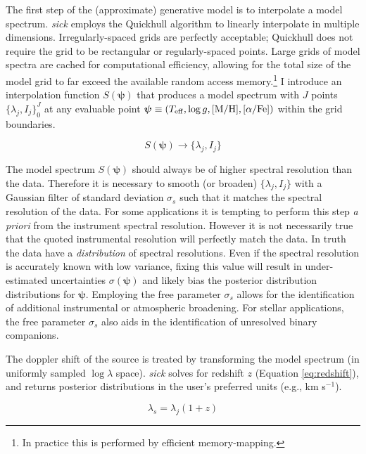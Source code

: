 \documentclass{aastex}
\newcommand{\sick}{\textit{sick}}
\begin{document}
The first step of the (approximate) generative model is to interpolate a model spectrum. \sick{} employs the Quickhull algorithm \citep{quickhull} to linearly interpolate in multiple dimensions. Irregularly-spaced grids are perfectly acceptable; Quickhull does not require the grid to be rectangular or regularly-spaced points. Large grids of model spectra are cached for computational efficiency, allowing for the total size of the model grid to far exceed the available random access memory.\footnote{In practice this is performed by efficient memory-mapping.} I introduce an interpolation function $S(\bm{\psi})$ that produces a model spectrum with $J$ points $\{\lambda_j,I_j\}_{0}^{J}$ at any evaluable point $\bm{\psi} \equiv (T_{\rm eff},\log{g},{\rm [M/H]},[\alpha/{\rm Fe}])$ within the grid boundaries.

\begin{equation}
S(\bm{\psi}) \rightarrow \{\lambda_j,I_j\}
\end{equation}

The model spectrum $S(\bm{\psi})$ should always be of higher spectral resolution than the data. Therefore it is necessary to smooth (or broaden) $\{\lambda_j,I_j\}$ with a Gaussian filter of standard deviation $\sigma_{s}$ such that it matches the spectral resolution of the data. For some applications it is tempting to perform this step \textit{a priori} from the instrument spectral resolution. However it is not necessarily true that the quoted instrumental resolution will perfectly match the data. In truth the data have a \textit{distribution} of spectral resolutions. Even if the spectral resolution is accurately known with low variance, fixing this value will result in under-estimated uncertainties $\sigma(\bm{\psi})$ and likely bias the posterior distribution distributions for $\bm{\psi}$. Employing the free parameter $\sigma_{s}$ allows for the identification of additional instrumental or atmospheric broadening. For stellar applications, the free parameter $\sigma_{s}$ also aids in the identification of unresolved binary companions.

The doppler shift of the source is treated by transforming the model spectrum (in uniformly sampled $\log\lambda$ space). \sick{} solves for redshift $z$ (Equation \ref{eq:redshift}), and returns posterior distributions in the user's preferred units (e.g., km s$^{-1}$).

\begin{equation}
\label{eq:redshift}
\lambda_{s} = \lambda_{j}(1 + z)
\end{equation}
\end{document}
